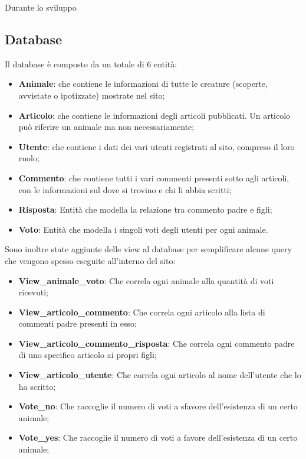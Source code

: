 Durante lo sviluppo 

\subsection{Database}
Il database è composto da un totale di 6 entità:
\begin{itemize}
	\item \textbf{Animale}: che contiene le informazioni di tutte le creature (scoperte, avvistate o ipotizzate) mostrate nel sito;
	\item \textbf{Articolo}: che contiene le informazioni degli articoli pubblicati. Un articolo può riferire un animale ma non necessariamente;
	\item \textbf{Utente}: che contiene i dati dei vari utenti registrati al sito, compreso il loro ruolo;
	\item \textbf{Commento}: che contiene tutti i vari commenti presenti sotto agli articoli, con le informazioni sul dove si trovino e chi li abbia scritti;
	\item \textbf{Risposta}: Entità che modella la relazione tra commento padre e figli;
	\item \textbf{Voto}: Entità che modella  i singoli voti degli utenti per ogni animale.
\end{itemize}
Sono inoltre state aggiunte delle view al database per semplificare alcune query che vengono spesso eseguite all'interno del sito:
\begin{itemize}
	\item \textbf{View\_animale\_voto}: Che correla ogni animale alla quantità di voti ricevuti;
	\item \textbf{View\_articolo\_commento}: Che correla ogni articolo alla lista di commenti padre presenti in esso;
	\item \textbf{View\_articolo\_commento\_risposta}: Che correla ogni commento padre di uno specifico articolo ai propri figli;
	\item \textbf{View\_articolo\_utente}: Che correla ogni articolo al nome dell'utente che lo ha scritto;
	\item \textbf{Vote\_no}: Che raccoglie il numero di voti a sfavore dell'esistenza di un certo animale;
	\item \textbf{Vote\_yes}: Che raccoglie il numero di voti a favore dell'esistenza di un certo animale;
\end{itemize}

